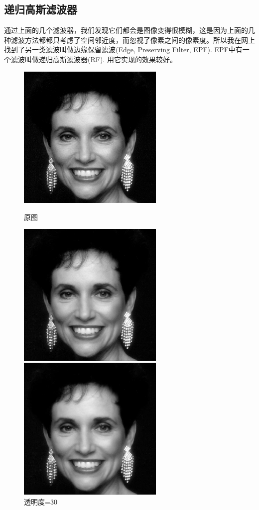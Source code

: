 \documentclass[11pt, a4paper, UTF8]{ctexart}
\begin{document}
    \subsection{递归高斯滤波器}
    通过上面的几个滤波器，我们发现它们都会是图像变得很模糊，这是因为上面的几种滤波方法都都只考虑了空间邻近度，而忽视了像素之间的像素度。所以我在网上找到了另一类滤波叫做边缘保留滤波(Edge, Preserving Filter, EPF). EPF中有一个滤波叫做递归高斯滤波器(RF). 用它实现的效果较好。

    \begin{figure}[H]
      \centering
      \begin{minipage}[t]{0.48\textwidth}
      \centering
      \includegraphics[width=7cm]{woman.png}
      \caption{原图}
      \end{minipage}
      \begin{minipage}[t]{0.48\textwidth}
      \centering
      \includegraphics[width=7cm]{RF_30.jpg}
      \caption{透明度=30}
      \end{minipage}
      \begin{minipage}[t]{0.48\textwidth}
        \centering
        \includegraphics[width=7cm]{RF_50.jpg}

\end{minipage}
\end{figure}
\end{document}

